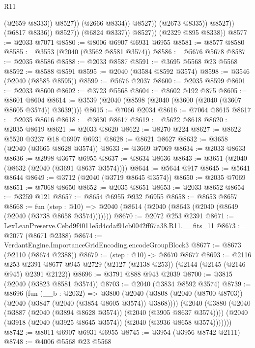 \begin{lexlean}{R11}
\begin{coremodule}
                                    (@2659 @8333))
                                  @8527))
                              (@2666 @8334))
                            @8527))
                        (@2673 @8335))
                      @8527))
                  (@6817 @8336))
                @8527))
            (@6824 @8337))
          @8527))
      (@2329 @895 @8338))
@8577 := @2033 @7071
@8580 := @8006 @6907 @6931 @6955
@8581 := @8577 @8580
@8585 := @3553 (@2040 (@3562 @8581 @3574))
@8586 := @5676 @5678
@8587 := @2035 @8586
@8588 := @2033 @8587
@8591 := @3695 @5568 @23 @5568
@8592 := @8588 @8591
@8595 := @2040 (@3584 @8592 @3574)
@8598 := @3546 (@2040 (@8585 @8595))
@8599 := @5676 @2037
@8600 := @2035 @8599
@8601 := @2033 @8600
@8602 := @3723 @5568
@8604 := @8602 @192 @875
@8605 := @8601 @8604
@8614 := @3539 (@2040 (@8598 (@2040 (@3600 (@2040 (@3607 @8605 @3574)) @3639))))
@8615 := @7066 @2034
@8616 := @7064 @8615
@8617 := @2035 @8616
@8618 := @3630 @8617
@8619 := @5622 @8618
@8620 := @2035 @8619
@8621 := @2033 @8620
@8622 := @8270 @224
@8627 := @8622 @5520 @3237 @18 @6907 @6931
@8628 := @8621 @8627
@8632 := @3658 (@2040 (@3665 @8628 @3574))
@8633 := @3669 @7069
@8634 := @2033 @8633
@8636 := @2998 @3677 @6955
@8637 := @8634 @8636
@8643 := @3651 (@2040 (@8632 (@2040 (@3691 @8637 @3574))))
@8644 := @5644 @917
@8645 := @5641 @8644
@8649 := @3712 (@2040 (@3719 @8645 @3574))
@8650 := @2035 @7069
@8651 := @7068 @8650
@8652 := @2035 @8651
@8653 := @2033 @8652
@8654 := @3259 @121
@8657 := @8654 @6955 @932 @6955
@8658 := @8653 @8657
@8668 := fun (step : @10) =>
  @2040 (@8614 (@2040 (@8643 (@2040 (@8649 (@2040 (@3738 @8658 @3574)))))))
@8670 := @2072 @253 @2391
@8671 := LexLeanPreserve.Cebd9f4011e5d4cdaf91cb0042ff67a38.R11.__fits_11
@8673 := @2077 (@8671 @2388)
@8674 := VerdantEngine.ImportanceGridEncoding.encodeGroupBlock3
@8677 := @8673 (@2110 (@8674 @2388))
@8679 := (step : @10) -> @8670 @8677
@8693 := @2116
    @253
    @2391
    @8677
    @945
    @2729
    (@2127 (@2138 @253))
    (@2144 (@2145 (@2146 @945) @2391 @2122))
@8696 := @3791 @888 @943 @2039
@8700 := @3815 (@2040 (@3823 @8581 @3574))
@8703 := @2040 (@3834 @8592 @3574)
@8739 := @8696
    (fun (__b : @2032) =>
    @3800
      (@2040 (@3808 (@2040 (@8700 @8703)) (@2040 (@3847 (@2040 (@3854 @8605 @3574)) @3868))))
      (@2040
        (@3880
          (@2040 (@3887 (@2040 (@3894 @8628 @3574)) (@2040 (@3905 @8637 @3574))))
          (@2040 (@3918 (@2040 (@3925 @8645 @3574)) (@2040 (@3936 @8658 @3574)))))))
@8742 := @8011 @6907 @6931 @6955
@8745 := @3954 (@3956 @8742 @2111)
@8748 := @4006 @5568 @23 @5568

\end{coremodule}
\end{lexlean}
